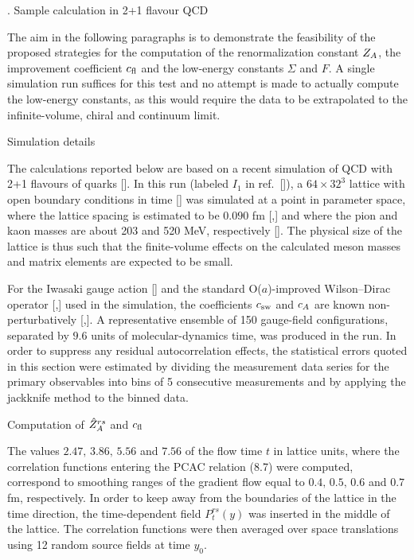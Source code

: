 

. Sample calculation in 2+1 flavour QCD

The aim in the following paragraphs is to demonstrate
the feasibility of the proposed strategies for the 
computation of the renormalization constant $Z_A$, 
the improvement coefficient $c_{\rm fl}$ and the low-energy constants
$\Sigma$ and $F$. A single simulation run suffices for this
test and no attempt is made to actually compute the 
low-energy constants,
as this would require the data to be extrapolated 
to the infinite-volume, chiral and continuum limit.


 Simulation details

The calculations reported below are based on a
recent simulation of QCD with 2+1 flavours of quarks [\cite{TMopenQCD}].
In this run (labeled $I_1$ in ref.~[\cite{TMopenQCD}]), 
a $64\times32^3$ lattice with open boundary conditions
in time [\cite{openQCD}]
was simulated at a point in parameter space, where
the lattice spacing is estimated to be $0.090$ fm
[\cite{AokiEtAlI},\cite{AokiEtAlII}] and where 
the pion and kaon masses are about 203 and 520 MeV,
respectively [\cite{TMopenQCD}].
The physical size of the lattice is thus 
such that the finite-volume effects on the calculated 
meson masses and matrix elements are expected to be small.

For the Iwasaki gauge action [\cite{Iwasaki}]
and the standard O($a$)-improved
Wilson--Dirac operator [\cite{SW},\cite{SFimp}] used
in the simulation, the coefficients 
$c_{\rm sw}$ and $c_A$ are known
non-perturbatively [\cite{AokiEtAlIII},\cite{KanekoEtAl}].
A representative ensemble of 150 gauge-field configurations,
separated by $9.6$ units of molecular-dynamics time,
was produced in the run.
In order to suppress
any residual autocorrelation effects,
the statistical errors quoted in this section
were estimated by 
dividing the measurement data series for the primary observables
into bins of 5 consecutive measurements
and by applying the jackknife method to the binned data.



 Computation of $\hat{Z}_A^{rs}$ and $c_{\rm fl}$

The values $2.47,\,3.86,\,5.56$ and $7.56$
of the flow time $t$ in lattice units, where
the correlation functions entering the PCAC relation (8.7)
were computed, correspond to smoothing ranges of the gradient
flow equal to $0.4,\,0.5,\,0.6$ and $0.7$ fm, respectively.
In order to keep away from the boundaries of the lattice
in the time direction, the
time-dependent field $P_t^{rs}(y)$ was inserted
in the middle of the lattice. The 
correlation functions were then averaged over space translations
using 12 random source fields at time $y_0$.

